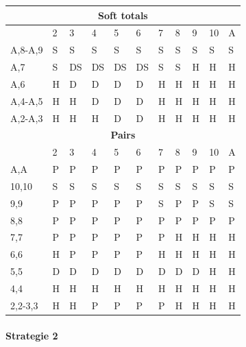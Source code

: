\documentclass[conference]{IEEEtran}
\begin{document}
\begin{table}[ht]
\begin{tabular}{|l|l|l|l|l|l|l|l|l|l|l|}
\multicolumn{11}{|c|}{\textbf{Soft totals}}                           \\ \hline
                             & 2 & 3 & 4 & 5 & 6 & 7 & 8 & 9 & 10 & A \\ \hline
A,8-A,9                      & S & S & S & S & S & S & S & S & S & S  \\ \hline
A,7                          & S & DS & DS & DS & DS & S & S & H & H & H  \\ \hline
A,6                          & H & D & D & D & D & H & H & H & H & H  \\ \hline
A,4-A,5                      & H & H & D & D & D & H & H & H & H & H  \\ \hline
A,2-A,3                      & H & H & H & D & D & H & H & H & H & H  \\ \hline

\multicolumn{11}{|c|}{\textbf{Pairs}}                                 \\ \hline
                             & 2 & 3 & 4 & 5 & 6 & 7 & 8 & 9 & 10 & A \\ \hline
A,A                          & P & P & P & P & P & P & P & P & P & P  \\ \hline
10,10                        & S & S & S & S & S & S & S & S & S & S  \\ \hline
9,9                          & P & P & P & P & P & S & P & P & S & S  \\ \hline
8,8                          & P & P & P & P & P & P & P & P & P & P  \\ \hline
7,7                          & P & P & P & P & P & P & H & H & H & H  \\ \hline
6,6                          & H & P & P & P & P & H & H & H & H & H  \\ \hline
5,5                          & D & D & D & D & D & D & D & D & H & H  \\ \hline
4,4                          & H & H & H & H & H & H & H & H & H & H  \\ \hline
2,2-3,3                      & H & H & P & P & P & P & H & H & H & H  \\ \hline
\end{tabular}
\end{table}


\paragraph{Strategie 2}
\end{document}
